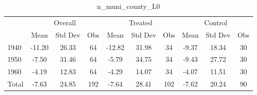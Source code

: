 \begin{table}[htbp]\centering
\def\sym#1{\ifmmode^{#1}\else\(^{#1}\)\fi}
\caption{n\_muni\_county\_L0 \label{tab1}}
\begin{tabular}{l*{3}{ccc}}
\toprule
                    &\multicolumn{3}{c}{Overall}           &\multicolumn{3}{c}{Treated}           &\multicolumn{3}{c}{Control}           \\
                    &        Mean&     Std Dev&         Obs&        Mean&     Std Dev&         Obs&        Mean&     Std Dev&         Obs\\
\midrule
1940                &      -11.20&       26.33&          64&      -12.82&       31.98&          34&       -9.37&       18.34&          30\\
1950                &       -7.50&       31.46&          64&       -5.79&       34.75&          34&       -9.43&       27.72&          30\\
1960                &       -4.19&       12.83&          64&       -4.29&       14.07&          34&       -4.07&       11.51&          30\\
Total               &       -7.63&       24.85&         192&       -7.64&       28.41&         102&       -7.62&       20.24&          90\\
\bottomrule
\end{tabular}
\end{table}
